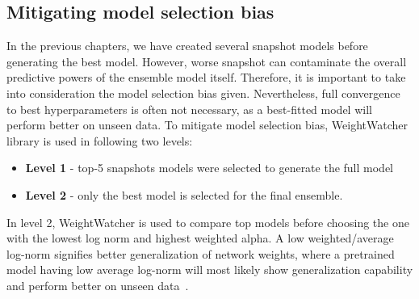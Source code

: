 \subsection{Mitigating model selection bias}
In the previous chapters, we have created several snapshot models before generating the best model. However, worse snapshot can contaminate the overall predictive powers of the ensemble model itself. Therefore, it is important to take into consideration the model selection bias given. %
Nevertheless, full convergence to best hyperparameters is often not necessary, as a best-fitted model will perform better on unseen data. To mitigate model selection bias,  WeightWatcher~\cite{martin2019traditional} library is used in following two levels: 

\begin{itemize}[noitemsep]
    \item \textbf{Level 1 } - top-5 snapshots models were selected to generate the full model
    \item \textbf{Level 2} - only the best model is selected for the final ensemble. 
\end{itemize}

\hspace*{3.5mm} In level 2, WeightWatcher is used to compare top models before choosing the one with the lowest log norm and highest weighted alpha. A low weighted/average log-norm signifies better generalization of network weights, where a pretrained model having low average log-norm will most likely show generalization capability and perform better on unseen data~\cite{martin2019traditional}. 


